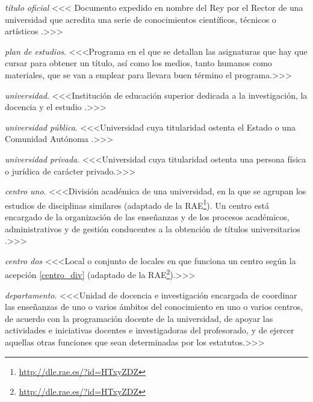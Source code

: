     \item \emph{título oficial} <<<\label{def_titulo_documento} Documento expedido en nombre del Rey por el Rector de una universidad \cite[artículo 35]{leyUniversidades} que acredita una serie de conocimientos científicos, técnicos o artísticos \cite[artículo 33]{leyUniversidades}.>>>

    \item \emph{plan de estudios}. <<<Programa en el que se detallan las asignaturas que hay que cursar para obtener un título, así como los medios, tanto humanos como materiales, que se van a emplear para llevara buen término el programa.>>>

    \item \emph{universidad}. <<<Institución de educación superior dedicada a la investigación, la docencia y el estudio \cite[articulo 1, apartado 1]{leyUniversidades}.>>>

    \item \emph{universidad pública}. <<<Universidad cuya titularidad ostenta el Estado o una Comunidad Autónoma \cite[artículo 3]{rdUniversidadesPrivadas}.>>>

    \item \emph{universidad privada}. <<<Universidad cuya titularidad ostenta una persona
        física o jurídica de carácter privado\cite[artículo 3]{rdUniversidadesPrivadas}.>>>

    \item \emph{centro uno}. <<<División académica de una universidad, en la que se agrupan los estudios de disciplinas similares (adaptado de la RAE\footnote{\url{http://dle.rae.es/?id=HTxyZDZ}}). Un centro está encargado de la organización de las enseñanzas y de los procesos académicos, administrativos y de gestión conducentes a la obtención de títulos universitarios \cite[artículo 8]{leyUniversidades}.>>>

     \item \emph{centro dos} <<<Local o conjunto de locales en que funciona un centro según la acepción \ref{centro_div} (adaptado de la RAE\footnote{\url{http://dle.rae.es/?id=HTxyZDZ}}).>>>

    \item \emph{departamento}. <<<Unidad de docencia e investigación encargada de coordinar las enseñanzas de uno o varios ámbitos del conocimiento en uno o varios centros, de acuerdo con la programación docente de la universidad, de apoyar las actividades e iniciativas docentes e investigadoras del profesorado, y de ejercer aquellas otras funciones que sean determinadas por los estatutos\cite[artículo 9]{leyUniversidades}.>>>

